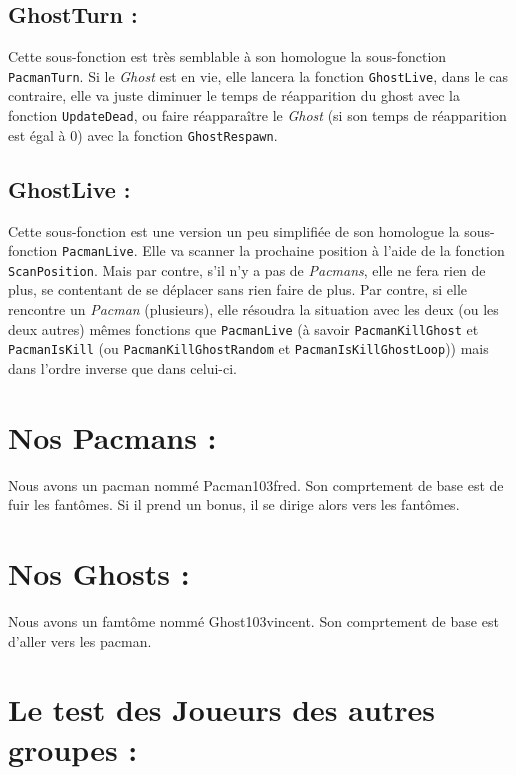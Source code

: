 \documentclass[a4paper, 11pt]{article}
\begin{document}
\subsection{GhostTurn :}

Cette sous-fonction est très semblable à son homologue la sous-fonction \texttt{PacmanTurn}.  Si le \textit{Ghost} est en vie, elle lancera la fonction \texttt{GhostLive}, dans le cas contraire, elle va juste diminuer le temps de réapparition du ghost avec la fonction \texttt{UpdateDead}, ou faire réapparaître le \textit{Ghost} (si son temps de réapparition est égal à 0) avec la fonction \texttt{GhostRespawn}.

\subsection{GhostLive :}

Cette sous-fonction est une version un peu simplifiée de son homologue la sous-fonction \texttt{PacmanLive}.  Elle va scanner la prochaine position à l'aide de la fonction \texttt{ScanPosition}.  Mais par contre, s'il n'y a pas de \textit{Pacmans}, elle ne fera rien de plus, se contentant de se déplacer sans rien faire de plus.  Par contre, si elle rencontre un \textit{Pacman} (plusieurs), elle résoudra la situation avec les deux (ou les deux autres) mêmes fonctions que \texttt{PacmanLive} (à savoir \texttt{PacmanKillGhost} et \texttt{PacmanIsKill} (ou \texttt{PacmanKillGhostRandom} et \texttt{PacmanIsKillGhostLoop})) mais dans l'ordre inverse que dans celui-ci. 

\section{Nos Pacmans :}

Nous avons un pacman nommé Pacman103fred. Son comprtement de base est de fuir les fantômes. Si il prend un bonus, il se dirige alors vers les fantômes.

\section{Nos Ghosts :}

Nous avons un famtôme nommé Ghost103vincent. Son comprtement de base est d'aller vers les pacman.

\section{Le test des Joueurs des autres groupes :}
\end{document}
